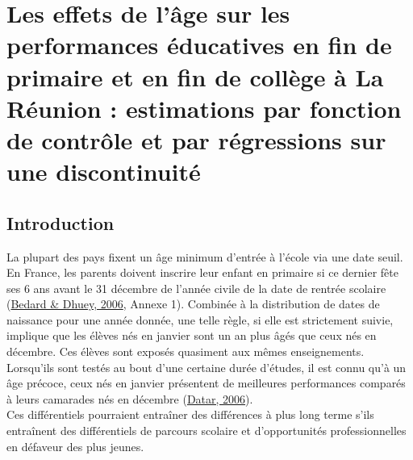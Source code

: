 \documentclass[
]{book}
\begin{document}
\hypertarget{age}{%
\chapter{Les effets de l'âge sur les performances éducatives en fin de primaire et en fin de collège à La Réunion : estimations par fonction de contrôle et par régressions sur une discontinuité}\label{age}}


\newpage

\hypertarget{ageintro}{%
\section{Introduction}\label{ageintro}}

La plupart des pays fixent un âge minimum d'entrée à l'école via une date seuil. En France, les parents doivent inscrire leur enfant en primaire si ce dernier fête ses 6 ans avant le 31 décembre de l'année civile de la date de rentrée scolaire (\protect\hyperlink{ref-BED:DHU:06}{Bedard \& Dhuey, 2006}, Annexe 1). Combinée à la distribution de dates de naissance pour une année donnée, une telle règle, si elle est strictement suivie, implique que les élèves nés en janvier sont un an plus âgés que ceux nés en décembre. Ces élèves sont exposés quasiment aux mêmes enseignements. Lorsqu'ils sont testés au bout d'une certaine durée d'études, il est connu qu'à un âge précoce, ceux nés en janvier présentent de meilleures performances comparés à leurs camarades nés en décembre (\protect\hyperlink{ref-DAT:06}{Datar, 2006}).\\
Ces différentiels pourraient entraîner des différences à plus long terme s'ils entraînent des différentiels de parcours scolaire et d'opportunités professionnelles en défaveur des plus jeunes.
\end{document}
